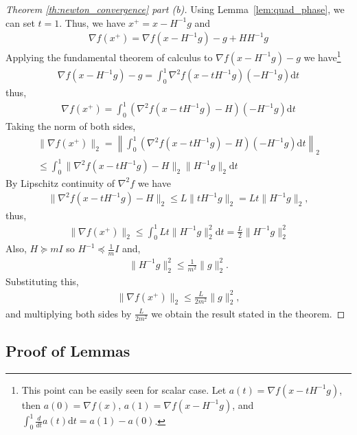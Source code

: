\documentclass[12pt]{report}
\begin{document}
\begin{proof}[Theorem \ref{th:newton_convergence} part (b)]

Using Lemma~\ref{lem:quad_phase}, we can set $t=1$. Thus, we have $x^{+}=x-H^{-1}g$ and 
\begin{align}
\nabla f(x^{+}) %
= \nabla f(x-H^{-1}g) - g + HH^{-1}g 
\end{align}
Applying the fundamental theorem of calculus to $\nabla f(x-H^{-1}g) - g$ we have\footnote{This point can be easily seen for scalar case. Let $a(t)=\nabla f(x-tH^{-1}g)$, then $a(0)=\nabla f(x)$, $a(1)=\nabla f(x-H^{-1}g)$, and $\int_{0}^{1}\frac{d}{dt}a(t) \mathrm{d}t=a(1)-a(0) $. } 
\begin{align}
\nabla f(x-H^{-1}g) - g = \int_{0}^{1} \nabla^2 f(x-tH^{-1}g) (-H^{-1}g) \mathrm{d}t
\end{align}
thus,
\begin{align}
\nabla f(x^{+}) =  \int_{0}^{1} \left( \nabla^2 f(x-tH^{-1}g) - H \right)(-H^{-1}g) \mathrm{d}t  
\end{align}
Taking the norm of both sides,
\begin{align}
\|\nabla f(x^{+})\|_2 = \left \| \int_{0}^{1} \left( \nabla^2 f(x-tH^{-1}g) - H \right) (-H^{-1}g) \mathrm{d}t \right \|_2 
\\ \le \int_{0}^{1} \|\nabla^2 f(x-tH^{-1}g) - H \|_2 \|H^{-1}g \|_2 \mathrm{d}t
\end{align}
By Lipschitz continuity of $\nabla^2 f$ we have
\begin{align}
  \|\nabla^2 f(x-tH^{-1}g) - H \|_2 \le L \| tH^{-1}g \|_2 = L t \| H^{-1}g \|_2,
\end{align}
thus,
\begin{align}
\|\nabla f(x^{+})\|_2 \le \int_{0}^{1} L t \|H^{-1}g \|_2^2 \mathrm{d}t= \frac{L}{2} \| H^{-1}g \|_2^2
\end{align}
Also, $H\succeq m I$ so $H^{-1}\preceq \frac{1}{m}I$ and,
\begin{align}
\| H^{-1}g \|_2^2 \leq \frac{1}{m^2} \|g\|_2^2.
\end{align}
Substituting this,
\begin{align}
\|\nabla f(x^{+})\|_2 \le \frac{L}{2 m^2} \|g\|_2^2,
\end{align}
and multiplying both sides by $\frac{L}{2m^2}$ we obtain the result stated in the theorem.
\end{proof}

\subsection{Proof of Lemmas}
\label{sec:lemma-proofs}
\end{document}

